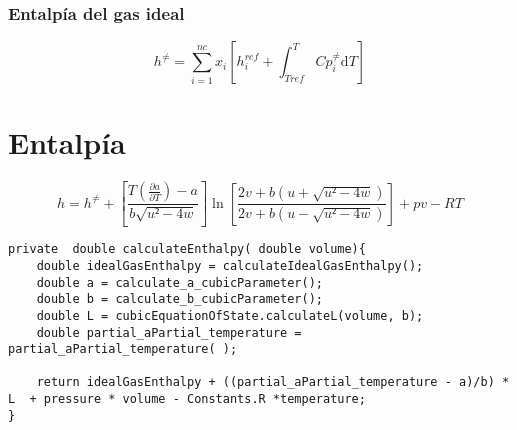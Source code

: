 \subsubsection{Entalpía del gas ideal}
\begin{equation}
h^{\neq} = \sum_{i=1}^{nc} x_i \left[ h_i^{ref} + \int_{Tref}^{T} Cp_i^{\neq} \mathrm{d}T \right]
\end{equation}

\section{Entalpía}
\begin{equation}
h = h^{\neq} + \left[ \frac{T(\frac{\partial a}{\partial T}) - a}{b\sqrt{u²-4w} }\right] 
\ln\left[\frac{2v+b\left(u + \sqrt{u²-4w}\right)}{2v+b\left(u - \sqrt{u²-4w}\right)}\right]
+ pv - RT
\end{equation}

\begin{lstlisting}[label=some-code,caption=Some Code]
private  double calculateEnthalpy( double volume){
    double idealGasEnthalpy = calculateIdealGasEnthalpy();
    double a = calculate_a_cubicParameter();
    double b = calculate_b_cubicParameter();
    double L = cubicEquationOfState.calculateL(volume, b);
    double partial_aPartial_temperature = partial_aPartial_temperature( );
    
    return idealGasEnthalpy + ((partial_aPartial_temperature - a)/b) * L  + pressure * volume - Constants.R *temperature;
}
\end{lstlisting}	